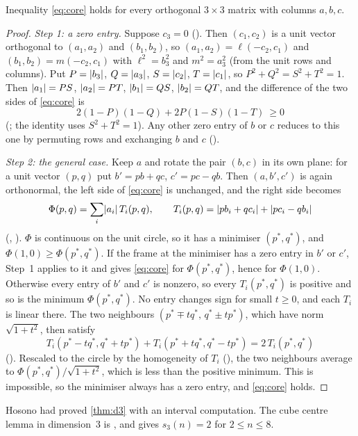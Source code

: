 \documentclass[11pt,a4paper]{article}
\begin{document}
\begin{theorem}\label{thm:d3}
Inequality \eqref{eq:core} holds for every orthogonal $3\times3$ matrix with columns $a,b,c$.
\end{theorem}

\begin{proof}
\emph{Step 1: a zero entry.} Suppose $c_3=0$ (). Then $(c_1,c_2)$ is a unit vector orthogonal to $(a_1,a_2)$ and $(b_1,b_2)$, so $(a_1,a_2)=\ell(-c_2,c_1)$ and $(b_1,b_2)=m(-c_2,c_1)$ with $\ell^2=b_3^2$ and $m^2=a_3^2$ (from the unit rows and columns). Put $P=\lvert b_3\rvert$, $Q=\lvert a_3\rvert$, $S=\lvert c_2\rvert$, $T=\lvert c_1\rvert$, so $P^2+Q^2=S^2+T^2=1$. Then $\lvert a_1\rvert=PS$, $\lvert a_2\rvert=PT$, $\lvert b_1\rvert=QS$, $\lvert b_2\rvert=QT$, and the difference of the two sides of \eqref{eq:core} is
\[
2(1-P)(1-Q)+2P(1-S)(1-T)\ \ge 0
\]
(; the identity uses $S^2+T^2=1$). Any other zero entry of $b$ or $c$ reduces to this one by permuting rows and exchanging $b$ and $c$ ().

\emph{Step 2: the general case.} Keep $a$ and rotate the pair $(b,c)$ in its own plane: for a unit vector $(p,q)$ put $b'=pb+qc$, $c'=pc-qb$. Then $(a,b',c')$ is again orthonormal, the left side of \eqref{eq:core} is unchanged, and the right side becomes
\[
\Phi(p,q)=\sum_i\lvert a_i\rvert\,T_i(p,q),\qquad T_i(p,q)=\lvert pb_i+qc_i\rvert+\lvert pc_i-qb_i\rvert
\]
(, ). $\Phi$ is continuous on the unit circle, so it has a minimiser $(p^*,q^*)$, and $\Phi(1,0)\ge\Phi(p^*,q^*)$. If the frame at the minimiser has a zero entry in $b'$ or $c'$, Step~1 applies to it and gives \eqref{eq:core} for $\Phi(p^*,q^*)$, hence for $\Phi(1,0)$. Otherwise every entry of $b'$ and $c'$ is nonzero, so every $T_i(p^*,q^*)$ is positive and so is the minimum $\Phi(p^*,q^*)$. No entry changes sign for small $t\ge0$, and each $T_i$ is linear there. The two neighbours $(p^*\mp tq^*,\,q^*\pm tp^*)$, which have norm $\sqrt{1+t^2}$, then satisfy
\[
T_i(p^*-tq^*,q^*+tp^*)+T_i(p^*+tq^*,q^*-tp^*)=2\,T_i(p^*,q^*)
\]
(). Rescaled to the circle by the homogeneity of $T_i$ (), the two neighbours average to $\Phi(p^*,q^*)/\sqrt{1+t^2}$, which is less than the positive minimum. This is impossible, so the minimiser always has a zero entry, and \eqref{eq:core} holds.
\end{proof}

Hosono had proved \cref{thm:d3} with an interval computation. The cube centre lemma in dimension~3 is , and  gives $s_3(n)=2$ for $2\le n\le 8$.
\end{document}
